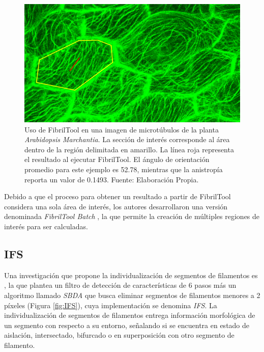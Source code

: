 \begin{figure}[h]
    \centering
    \includegraphics[scale=0.6]{evalImages/fibriltool-c1-mt-GFP-hipocotilo-zoom.png}
    \caption[Ejemplo de FibrilTool en microt\'ubulos]{Uso de FibrilTool en una imagen de microt\'ubulos de la planta {\it Arabidopsis Marchantia}. La secci\'on de inter\'es corresponde al \'area dentro de la regi\'on delimitada en amarillo. La l\'inea roja representa el resultado al ejecutar FibrilTool. El \'angulo de orientaci\'on promedio para este ejemplo es 52.78\textdegree, mientras que la anistrop\'ia reporta un valor de 0.1493. Fuente: Elaboraci\'on Propia.}
    \label{fig:FibrilToolexample}
\end{figure}

Debido a que el proceso para obtener un resultado a partir de FibrilTool considera una sola \'area de inter\'es, los autores desarrollaron una versi\'on denominada {\it FibrilTool Batch} , la que permite la creaci\'on de m\'ultiples regiones de inter\'es para ser calculadas.

\subsection{IFS}
Una investigaci\'on que propone la individualizaci\'on de segmentos de filamentos es \citet{qiu2014quantitative}, la que plantea un filtro de detecci\'on de caracter\'isticas de 6 pasos m\'as un algoritmo llamado \textit{SBDA} que busca eliminar segmentos de filamentos menores a 2 p\'ixeles (Figura \ref{fig:IFS}), cuya implementaci\'on se denomina {\it IFS}. La individualizaci\'on de segmentos de filamentos entrega informaci\'on morfol\'ogica de un segmento con respecto a su entorno, se\~nalando si se encuentra en estado de aislaci\'on, intersectado, bifurcado o en superposici\'on con otro segmento de filamento.


